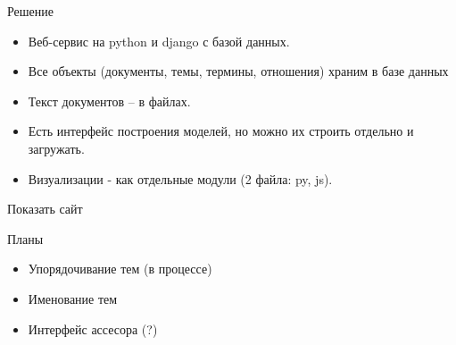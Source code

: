 \documentclass{beamer}
\begin{document}
\begin{frame}{Решение}
		\begin{itemize}  
			\item Веб-сервис на python и django с базой данных.
			\item Все объекты (документы, темы, термины, отношения) храним в базе данных
			\item Текст документов -- в файлах.
			\item Есть интерфейс построения моделей, но можно их строить отдельно и загружать.
			\item Визуализации - как отдельные модули (2 файла: py, js).
		\end{itemize}
\end{frame} 

\begin{frame}{Показать сайт}
	
\end{frame} 


\begin{frame}{Планы}
		\begin{itemize}  
			\item Упорядочивание тем (в процессе)
			\item Именование тем
			\item Интерфейс ассесора (?)
		\end{itemize}
\end{frame} 
\end{document}
